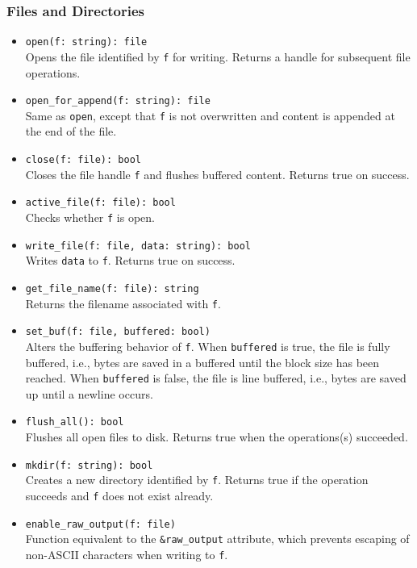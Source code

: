 \documentclass[10pt,landscape]{article}
\begin{document}
\begin{multicols*}{2}
\subsubsection*{Files and Directories}

\begin{itemize}
  \item \verb|open(f: string): file|\\
    Opens the file identified by \texttt{f} for writing. Returns a handle
    for subsequent file operations.
  \item \verb|open_for_append(f: string): file|\\
    Same as \texttt{open}, except that \texttt{f} is not overwritten and
    content is appended at the end of the file.
  \item \verb|close(f: file): bool|\\
    Closes the file handle \texttt{f} and flushes buffered content. Returns
    true on success.
  \item \verb|active_file(f: file): bool|\\
    Checks whether \texttt{f} is open.
  \item \verb|write_file(f: file, data: string): bool|\\
    Writes \texttt{data} to \texttt{f}. Returns true on success.
  \item \verb|get_file_name(f: file): string|\\
    Returns the filename associated with \texttt{f}.
  \item \verb|set_buf(f: file, buffered: bool)|\\
    Alters the buffering behavior of \texttt{f}. When \texttt{buffered} is
    true, the file is fully buffered, i.e., bytes are saved in a buffered until
    the block size has been reached. When \texttt{buffered} is false, the file
    is line buffered, i.e., bytes are saved up until a newline occurs.
  \item \verb|flush_all(): bool|\\
    Flushes all open files to disk.
    Returns true when the operations(s) succeeded.
  \item \verb|mkdir(f: string): bool|\\
    Creates a new directory identified by \texttt{f}. Returns true if the
    operation succeeds and \texttt{f} does not exist already.
  \item \verb|enable_raw_output(f: file)|\\
    Function equivalent to the \verb|&raw_output| attribute, which prevents
    escaping of non-ASCII characters when writing to \verb|f|.
\end{itemize}


\end{multicols*}
\end{document}
